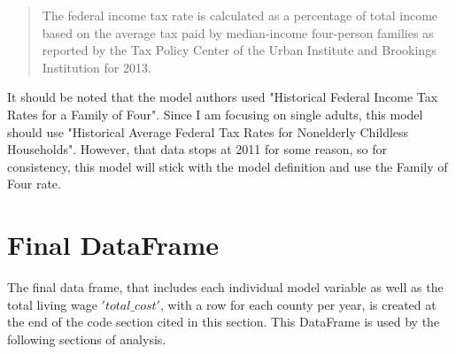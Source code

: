 \begin{quote}
The federal income tax rate is calculated as a percentage of total income based on the average tax paid by median-income four-person families as reported by the Tax Policy Center of the Urban Institute and Brookings Institution for 2013.
\end{quote}

It should be noted that the model authors used "Historical Federal Income Tax Rates for a Family of Four". Since I am focusing on single adults, this model should use "Historical Average Federal Tax Rates for Nonelderly Childless Households". However, that data stops at 2011 for some reason, so for consistency, this model will stick with the model definition and use the Family of Four rate.

\section{Final DataFrame}

The final data frame, that includes each individual model variable as well as the total living wage \('total\_cost'\), with a row for each county per year, is created at the end of the code section cited in this section. This DataFrame is used by the following sections of analysis.